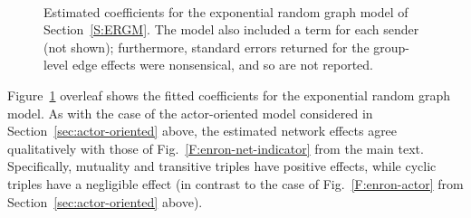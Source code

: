 \documentclass[final]{statsoc}
\begin{document}
\begin{figure}
\centering
{}
\\
\caption{\label{F:enron-ergm}Estimated coefficients for the exponential random graph model of Section~\ref{S:ERGM}.  The model also included a term for each sender (not shown); furthermore, standard errors returned for the group-level edge effects were nonsensical, and so are not reported.
}
\end{figure}

Figure~\ref{F:enron-ergm} overleaf shows the fitted coefficients for the exponential
random graph model.  As with the case of the actor-oriented model considered
in Section~\ref{sec:actor-oriented} above, the
estimated network effects agree qualitatively with those of
Fig.~\ref{F:enron-net-indicator} from the main text.  Specifically, mutuality and transitive
triples have positive effects, while cyclic triples have a negligible effect
(in contrast to the case of Fig.~\ref{F:enron-actor} from
Section~\ref{sec:actor-oriented} above).
\end{document}
